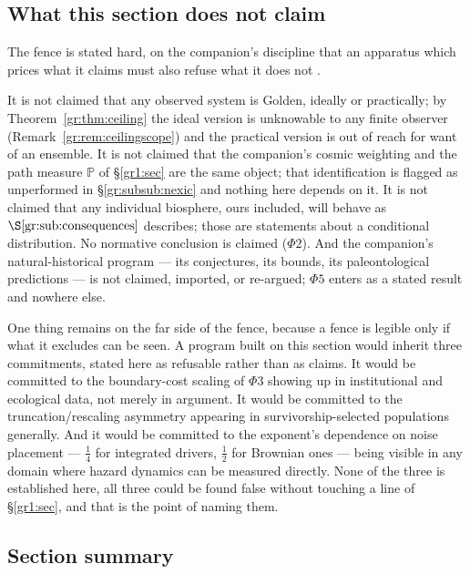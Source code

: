 \documentclass[11pt]{article}
\numberwithin{equation}{section}
\theoremstyle{plain}
\theoremstyle{definition}
\theoremstyle{remark}
\newcommand{\PP}{\mathbb{P}}
\begin{document}
\subsection{What this section does not claim}\label{gr:sub:fence}

The fence is stated hard, on the companion's discipline that an
apparatus which prices what it claims must also refuse what it does not
\cite{Ben26Optimal}.

It is not claimed that any observed system is Golden, ideally or
practically; by Theorem~\ref{gr:thm:ceiling} the ideal version is
unknowable to any finite observer (Remark~\ref{gr:rem:ceilingscope}) and
the practical version is out of reach for want of an ensemble. It is not claimed that the companion's cosmic
weighting and the path measure $\PP$ of
\S\ref{gr1:sec} are the same object; that
identification is flagged as unperformed in
\S\ref{gr:subsub:nexic} and nothing here depends on it. It is not
claimed that any individual biosphere, ours included, will behave as
$\S\ref{gr:sub:consequences}$ describes; those are statements about a
conditional distribution. No normative conclusion is claimed
($\Phi2$). And the companion's natural-historical program --- its
conjectures, its bounds, its paleontological predictions --- is not
claimed, imported, or re-argued; $\Phi5$ enters as a stated result and
nowhere else.

One thing remains on the far side of the fence, because a fence is
legible only if what it excludes can be seen. A program built on this
section would inherit three commitments, stated here as refusable rather
than as claims. It would be committed to the boundary-cost scaling of
$\Phi3$ showing up in institutional and ecological data, not merely in
argument. It would be committed to the truncation/rescaling asymmetry
appearing in survivorship-selected populations generally. And it would
be committed to the exponent's dependence on noise placement --- $\tfrac14$
for integrated drivers, $\tfrac12$ for Brownian ones --- being visible
in any domain where hazard dynamics can be measured directly. None of
the three is established here, all three could be found false without
touching a line of \S\ref{gr1:sec}, and that is the
point of naming them.

\subsection*{Section summary}
\end{document}
